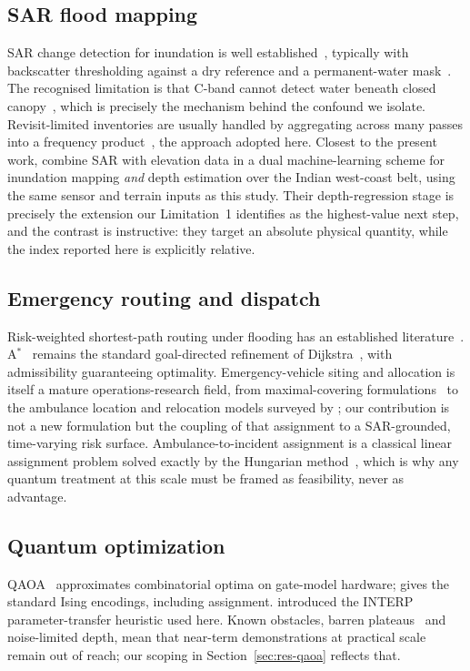 \documentclass[11pt,a4paper]{article}
\begin{document}
\subsection{SAR flood mapping}
SAR change detection for inundation is well established~\citep{martinis2009,
twele2016,shen2019}, typically with backscatter thresholding against a dry
reference and a permanent-water mask~\citep{pekel2016}. The recognised limitation
is that C-band cannot detect water beneath closed
canopy~\citep{townsend2002,tsyganskaya2018}, which is precisely the mechanism
behind the confound we isolate. Revisit-limited inventories are usually handled
by aggregating across many passes into a frequency
product~\citep{pekel2016,donchyts2016}, the approach adopted here.
Closest to the present work, \citet{sadhwani2026} combine SAR with elevation data
in a dual machine-learning scheme for inundation mapping \emph{and} depth
estimation over the Indian west-coast belt, using the same sensor and terrain
inputs as this study. Their depth-regression stage is precisely the extension our
Limitation~1 identifies as the highest-value next step, and the contrast is
instructive: they target an absolute physical quantity, while the index reported
here is explicitly relative.

\subsection{Emergency routing and dispatch}
Risk-weighted shortest-path routing under flooding has an established
literature~\citep{zhang2019,yin2016}. A$^\ast$~\citep{hart1968} remains the
standard goal-directed refinement of Dijkstra~\citep{dijkstra1959}, with
admissibility guaranteeing optimality. Emergency-vehicle siting and allocation is
itself a mature operations-research field, from maximal-covering
formulations~\citep{church1974} to the ambulance location and relocation models
surveyed by \citet{brotcorne2003}; our contribution is not a new formulation but
the coupling of that assignment to a SAR-grounded, time-varying risk surface.
Ambulance-to-incident assignment is a classical linear assignment problem solved
exactly by the Hungarian method~\citep{kuhn1955}, which is why any quantum
treatment at this scale must be framed as feasibility, never as advantage.

\subsection{Quantum optimization}
QAOA~\citep{farhi2014} approximates combinatorial optima on gate-model hardware;
\citet{lucas2014} gives the standard Ising encodings, including assignment.
\citet{zhou2020} introduced the INTERP parameter-transfer heuristic used here.
Known obstacles, barren plateaus~\citep{mcclean2018} and noise-limited depth,
mean that near-term demonstrations at practical scale remain out of reach; our
scoping in Section~\ref{sec:res-qaoa} reflects that.
\end{document}

